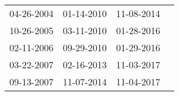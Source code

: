 \begin{supertabular}{llll}
 04-26-2004 &  01-14-2010 &  11-08-2014 \\
 10-26-2005 &  03-11-2010 &  01-28-2016 \\
 02-11-2006 &  09-29-2010 &  01-29-2016 \\
 03-22-2007 &  02-16-2013 &  11-03-2017 \\
 09-13-2007 &  11-07-2014 &  11-04-2017 \\
\end{supertabular}
